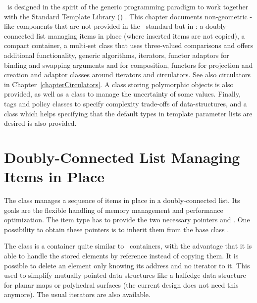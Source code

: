 



\minitoc

\cgal\ is designed in the spirit of the generic programming paradigm
to work together with the Standard Template Library (\stl)
\cite{cgal:ansi-is14882-98,cgal:a-gps-98}. This chapter documents non-geometric
\stl-like components that are not provided in the \stl\ standard but
in \cgal: a doubly-connected list managing items in place (where
inserted items are not copied), a compact container, a multi-set class that
uses three-valued comparisons and offers additional functionality,
generic algorithms, iterators, functor adaptors for binding and swapping
arguments and for composition, functors for projection and creation and
adaptor classes around iterators and circulators. See also circulators in
Chapter~\ref{chapterCirculators}.  A class storing polymorphic objects
is also provided, as well as a class to manage the uncertainty of some values.
Finally, tags and policy classes to specify complexity trade-offs of data-structures,
and a class which helps specifying that the default types in template
parameter lists are desired is also provided.

\section{Doubly-Connected List Managing Items in Place}

The class  manages a
sequence of items in place in a doubly-connected list. Its goals are
the flexible handling of memory management and performance
optimization. The item type has to provide the two necessary
pointers  and . One possibility
to obtain these pointers is to inherit them from the base class
.

The class  is a container quite similar
to \stl\ containers, with the advantage that it is able to handle the
stored elements by reference instead of copying them. It is possible
to delete an element only knowing its address and no iterator to it.
This used to simplify mutually pointed data structures like a halfedge
data structure for planar maps or polyhedral surfaces (the current design
does not need this anymore). The usual iterators are also available.

